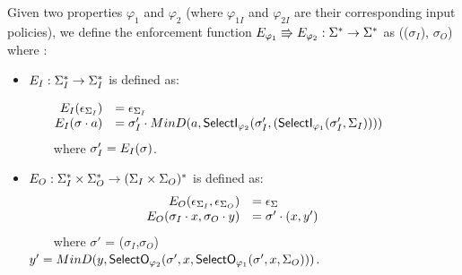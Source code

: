 \begin{definition}
	\label{def:serialComp2}
	Given two properties $\varphi_1$ and $\varphi_2$ (where $\varphi_{1I}$ and $\varphi_{2I}$ are their corresponding input policies), we define the enforcement function $E_{{\varphi_1}} \Rrightarrow E_{{\varphi_2}} : \Sigma^* \rightarrow \Sigma^*$ as \efo(\efi($\sigma_I$), $\sigma_O$) where :
	
	
	
	\begin{itemize}
		\item $E_{I}: \Sigma_I^* \rightarrow \Sigma_I^* $ is defined as:
		
		
		\[
		\begin{array}{rll}
			\hspace{-4em}	\efi(\epsilon_{\Sigma_I})& = \epsilon_{\Sigma_I} \\
			
			\hspace{-4em} \efi(\sigma \cdot a) & = \sigma'_I \cdot MinD(a,\selectI_{\varphi_{2}}(\sigma'_I,(\selectI_{\varphi_{1}}(\sigma'_I,\Sigma_I))))
			
			
		\end{array}
		\]
		~~~~where $\sigma'_I= E_{I}(\sigma) $.
		
		\vspace{1em}	
		\item $E_{O}: \Sigma^*_I \times \Sigma^*_O \rightarrow (\Sigma_I \times \Sigma_O)^*$ is defined as:
		\[
		\begin{array}{rll}
			\efo(\epsilon_{\Sigma_I}, \epsilon_{\Sigma_O})& = \epsilon_\Sigma\\
			\hspace{-2em}
			\efo(\sigma_I \cdot x, \sigma_O \cdot y) & = \sigma' \cdot (x,y')
			
		\end{array}
		\]
		~~~~where $\sigma'$ = \efo($\sigma_I$,$\sigma_O$) \\
		$y'= MinD(y,\mathsf{SelectO}_{\varphi_2}(\sigma',x,\mathsf{SelectO}_{\varphi_1}(\sigma',x,\Sigma_O)))$.	
	\end{itemize}
	
\end{definition}



